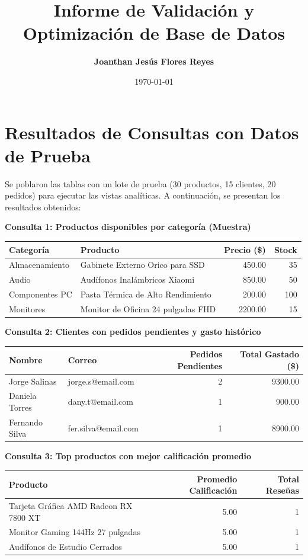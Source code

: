 \documentclass[11pt,a4paper]{article}
\title{\textbf{Informe de Validación y Optimización de Base de Datos}}
\author{\textbf{Joanthan Jesús Flores Reyes}}
\date{\today}
\begin{document}
\maketitle

\section{Resultados de Consultas con Datos de Prueba}
Se poblaron las tablas con un lote de prueba (30 productos, 15 clientes, 20 pedidos) para ejecutar las vistas analíticas. A continuación, se presentan los resultados obtenidos:

\textbf{Consulta 1: Productos disponibles por categoría (Muestra)}
\begin{table}[H]
    \centering
    \footnotesize
    \begin{tabular}{@{}llrr@{}}
        \toprule
        \textbf{Categoría} & \textbf{Producto} & \textbf{Precio (\$)} & \textbf{Stock} \\
        \midrule
        Almacenamiento & Gabinete Externo Orico para SSD & 450.00 & 35 \\
        Audio & Audífonos Inalámbricos Xiaomi & 850.00 & 50 \\
        Componentes PC & Pasta Térmica de Alto Rendimiento & 200.00 & 100 \\
        Monitores & Monitor de Oficina 24 pulgadas FHD & 2200.00 & 15 \\
        \bottomrule
    \end{tabular}
\end{table}

\textbf{Consulta 2: Clientes con pedidos pendientes y gasto histórico}
\begin{table}[H]
    \centering
    \footnotesize
    \begin{tabular}{@{}llrr@{}}
        \toprule
        \textbf{Nombre} & \textbf{Correo} & \textbf{Pedidos Pendientes} & \textbf{Total Gastado (\$)} \\
        \midrule
        Jorge Salinas & jorge.s@email.com & 2 & 9300.00 \\
        Daniela Torres & dany.t@email.com & 1 & 900.00 \\
        Fernando Silva & fer.silva@email.com & 1 & 8900.00 \\
        \bottomrule
    \end{tabular}
\end{table}

\textbf{Consulta 3: Top productos con mejor calificación promedio}
\begin{table}[H]
    \centering
    \footnotesize
    \begin{tabular}{@{}lrr@{}}
        \toprule
        \textbf{Producto} & \textbf{Promedio Calificación} & \textbf{Total Reseñas} \\
        \midrule
        Tarjeta Gráfica AMD Radeon RX 7800 XT & 5.00 & 1 \\
        Monitor Gaming 144Hz 27 pulgadas & 5.00 & 1 \\
        Audífonos de Estudio Cerrados & 5.00 & 1 \\
        \bottomrule
    \end{tabular}
\end{table}
\end{document}
